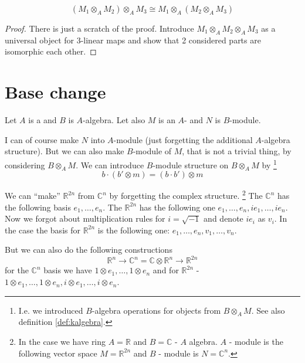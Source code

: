 \begin{proposition}[Associative]
  \[
  \left(M_1 \otimes_A M_2\right) \otimes_A M_3
  \cong
  M_1 \otimes_A \left(M_2 \otimes_A M_3\right)
  \]
  \begin{proof}
    There is just a scratch of the proof.
    Introduce
    $M_1 \otimes_A M_2 \otimes_A M_3$
    as a universal object for 3-linear maps and show that 2 considered
    parts are isomorphic each other.
  \end{proof}
  \label{prop:lec4_Associative}
\end{proposition}

\section{Base change}

Let $A$ is a  and $B$ is $A$-algebra. Let also $M$
is an $A$- and $N$ is $B$-module.

I can of course make $N$ into $A$-module (just forgetting the
additional $A$-algebra structure). But we can also make $B$-module of
$M$, that is not a trivial thing, by considering $B \otimes_A M$.
We can introduce $B$-module structure on $B \otimes_A M$ by
\footnote{
  I.e. we introduced $B$-algebra operations for objects from
  $B \otimes_A M$. See also definition \ref{def:kalgebra}.
}
\[
b \cdot \left(b' \otimes m \right) = \left( b \cdot b' \right) \otimes m 
\]

\begin{example}
  We can ``make'' $\mathbb{R}^{2n}$ from $\mathbb{C}^n$ by forgetting
  the complex structure.
  \footnote{
    In the case we have ring $A = \mathbb{R}$ and $B = \mathbb{C}$ -
    $A$ algebra. $A$ - module is the following vector space
    $M = \mathbb{R}^{2n}$ and $B$ - module is $N = \mathbb{C}^n$.
  }
  The $\mathbb{C}^n$ has the following basis $e_1, \dots, e_n$.
  The $\mathbb{R}^{2n}$ has the following one
  $e_1, \dots, e_n, i e_1, \dots, i e_n$. Now we forgot about
  multiplication rules for $i = \sqrt{-1}$ and denote $i e_i$ as
  $v_i$. In the case the basis for $\mathbb{R}^{2n}$ is the following
  one: $e_1, \dots, e_n, v_1, \dots, v_n$.

  But we can also do the following constructions
  \[
  \mathbb{R}^n \rightarrow
  \mathbb{C}^n = \mathbb{C} \otimes \mathbb{R}^n \rightarrow
  \mathbb{R}^{2n}
  \]
  for the $\mathbb{C}^n$ basis we have
  $1 \otimes e_1, \dots, 1 \otimes e_n$ and for $\mathbb{R}^{2n}$ -
  $1 \otimes e_1, \dots, 1 \otimes e_n, i \otimes e_1, \dots, i
  \otimes e_n$.
\end{example}

